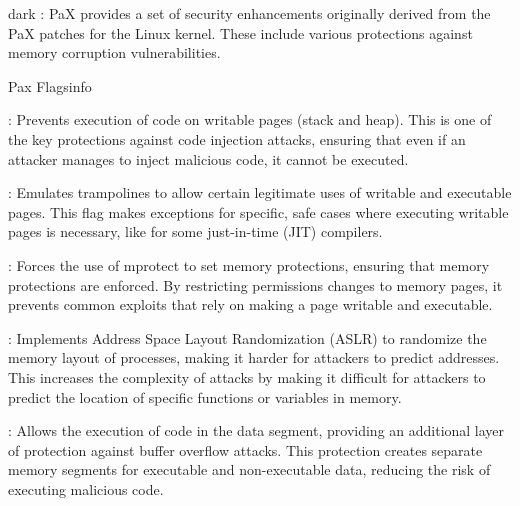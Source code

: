 \label{PaX}
\begin{baseBoxThree}{}{dark}
    \bigskip
    : PaX provides a set of security enhancements originally derived from the PaX patches for the Linux kernel.
    These include various protections against memory corruption vulnerabilities.
    \bigskip
    \label{Open Flags}
    \begin{baseBoxThree}{Pax Flags}{info}
        \smallskip
        \begin{posnexItemize}
            \item[\sA] : Prevents execution of code on writable pages (stack and heap). 
            This is one of the key protections against code injection attacks, ensuring that even if an attacker manages to inject malicious code, it cannot be executed.
            \item[\sA] : Emulates trampolines to allow certain legitimate uses of writable and executable pages.
            This flag makes exceptions for specific, safe cases where executing writable pages is necessary, like for some just-in-time (JIT) compilers.
            \item[\sA] : Forces the use of mprotect to set memory protections, ensuring that memory protections are enforced.
            By restricting permissions changes to memory pages, it prevents common exploits that rely on making a page writable and executable.
            \item[\sA] : Implements Address Space Layout Randomization (ASLR) to randomize the memory layout of processes, making it harder for attackers to predict addresses.
            This increases the complexity of attacks by making it difficult for attackers to predict the location of specific functions or variables in memory.
            \item[\sA] : Allows the execution of code in the data segment, providing an additional layer of protection against buffer overflow attacks.
            This protection creates separate memory segments for executable and non-executable data, reducing the risk of executing malicious code.
        \end{posnexItemize}
        \smallskip
    \end{baseBoxThree}
    \smallskip
\end{baseBoxThree}

